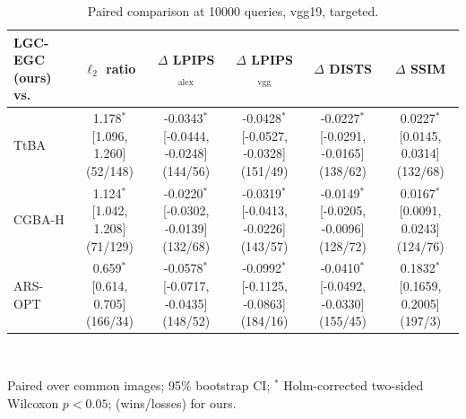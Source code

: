 \begin{table}[t]
\centering\footnotesize
\caption{Paired comparison at 10000 queries, vgg19, targeted.}
\begin{tabular}{lccccc}
\toprule
LGC-EGC (ours) vs. & $\ell_2$ ratio & $\Delta$ LPIPS$_{\mathrm{alex}}$ & $\Delta$ LPIPS$_{\mathrm{vgg}}$ & $\Delta$ DISTS & $\Delta$ SSIM \\
\midrule
TtBA & 1.178$^{*}$ [1.096, 1.260] (52/148) & -0.0343$^{*}$ [-0.0444, -0.0248] (144/56) & -0.0428$^{*}$ [-0.0527, -0.0328] (151/49) & -0.0227$^{*}$ [-0.0291, -0.0165] (138/62) & 0.0227$^{*}$ [0.0145, 0.0314] (132/68) \\
CGBA-H & 1.124$^{*}$ [1.042, 1.208] (71/129) & -0.0220$^{*}$ [-0.0302, -0.0139] (132/68) & -0.0319$^{*}$ [-0.0413, -0.0226] (143/57) & -0.0149$^{*}$ [-0.0205, -0.0096] (128/72) & 0.0167$^{*}$ [0.0091, 0.0243] (124/76) \\
ARS-OPT & 0.659$^{*}$ [0.614, 0.705] (166/34) & -0.0578$^{*}$ [-0.0717, -0.0435] (148/52) & -0.0992$^{*}$ [-0.1125, -0.0863] (184/16) & -0.0410$^{*}$ [-0.0492, -0.0330] (155/45) & 0.1832$^{*}$ [0.1659, 0.2005] (197/3) \\
\bottomrule
\end{tabular}
\\[2pt]\parbox{\linewidth}{\scriptsize Paired over common images; 95\% bootstrap CI; $^{*}$ Holm-corrected two-sided Wilcoxon $p<0.05$; (wins/losses) for ours.}
\end{table}

